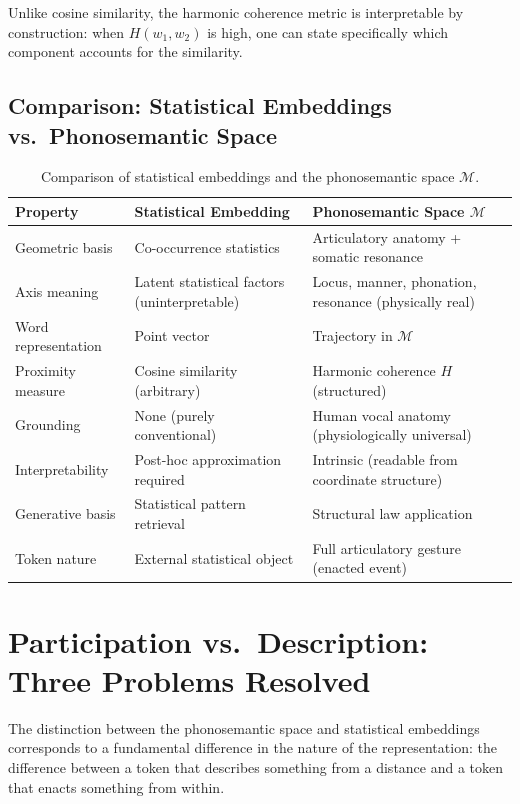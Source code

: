\documentclass[12pt]{article}
\begin{document}
Unlike cosine similarity, the harmonic coherence metric is interpretable by construction: when $H(w_1, w_2)$ is high, one can state specifically which component accounts for the similarity.

\subsection{Comparison: Statistical Embeddings vs.\ Phonosemantic Space}

\begin{table}[htbp]
\centering
\renewcommand{\arraystretch}{1.3}
\begin{tabular}{p{3cm}p{4.5cm}p{5cm}}
\toprule
\textbf{Property} & \textbf{Statistical Embedding} & \textbf{Phonosemantic Space $\mathcal{M}$} \\
\midrule
Geometric basis & Co-occurrence statistics & Articulatory anatomy + somatic resonance \\
Axis meaning & Latent statistical factors (uninterpretable) & Locus, manner, phonation, resonance (physically real) \\
Word representation & Point vector & Trajectory in $\mathcal{M}$ \\
Proximity measure & Cosine similarity (arbitrary) & Harmonic coherence $H$ (structured) \\
Grounding & None (purely conventional) & Human vocal anatomy (physiologically universal) \\
Interpretability & Post-hoc approximation required & Intrinsic (readable from coordinate structure) \\
Generative basis & Statistical pattern retrieval & Structural law application \\
Token nature & External statistical object & Full articulatory gesture (enacted event) \\
\bottomrule
\end{tabular}
\caption{Comparison of statistical embeddings and the phonosemantic space $\mathcal{M}$.}
\end{table}


\section{Participation vs.\ Description: Three Problems Resolved}
\label{sec:participation}

The distinction between the phonosemantic space and statistical embeddings corresponds to a fundamental difference in the nature of the representation: the difference between a token that describes something from a distance and a token that enacts something from within.
\end{document}
